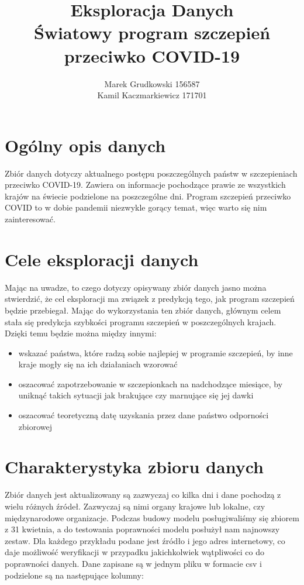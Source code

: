 \documentclass[12pt, oneside]{article}
\title{
	Eksploracja Danych \\
	Światowy program szczepień przeciwko COVID-19
}
\author{
	Marek Grudkowski 156587
	\\
	Kamil Kaczmarkiewicz 171701
}
\begin{document}
\maketitle

\section{Ogólny opis danych}

Zbiór danych dotyczy aktualnego postępu poszczególnych państw w szczepieniach przeciwko COVID-19. Zawiera on informacje pochodzące prawie ze wszystkich krajów na świecie podzielone na poszczególne dni. Program szczepień przeciwko COVID to w dobie pandemii niezwykle gorący temat, więc warto się nim zainteresować.

\section{Cele eksploracji danych}

Mając na uwadze, to czego dotyczy opisywany zbiór danych jasno można stwierdzić, że cel eksploracji ma związek z predykcją tego, jak program szczepień będzie przebiegał. Mając do wykorzystania ten zbiór danych, głównym celem stała się predykcja szybkości programu szczepień w poszczególnych krajach. Dzięki temu będzie można między innymi:
\begin{itemize}
	\item wskazać państwa, które radzą sobie najlepiej w programie szczepień, by inne kraje mogły się na ich działaniach wzorować
	\item oszacować zapotrzebowanie w szczepionkach na nadchodzące miesiące, by uniknąć takich sytuacji jak brakujące czy marnujące się jej dawki
	\item oszacować teoretyczną datę uzyskania przez dane państwo odporności zbiorowej
\end{itemize}

\section{Charakterystyka zbioru danych}

Zbiór danych jest aktualizowany są zazwyczaj co kilka dni i dane pochodzą z wielu różnych
źródeł. Zazwyczaj są nimi organy krajowe lub lokalne, czy międzynarodowe organizacje. Podczas budowy modelu posługiwaliśmy się zbiorem z 31 kwietnia, a do testowania poprawności modelu posłużył nam najnowszy zestaw. 
Dla każdego przykładu podane jest źródło i jego adres internetowy, co daje możliwość weryfikacji w przypadku jakichkolwiek wątpliwości co do poprawności danych. Dane zapisane są w jednym pliku w formacie csv i podzielone są na następujące kolumny:
\end{document}
